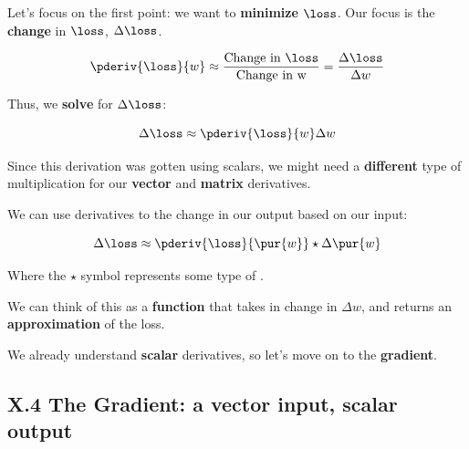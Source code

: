         Let's focus on the first point: we want to \textbf{minimize} $\loss$. Our focus is the \textbf{change} in $\loss$, $\Delta \loss$.
        
        \begin{equation}
            \pderiv{\loss}{w} 
            \approx 
            \frac{\text{Change in }\loss }{ \text{Change in w} }
            =
            \frac{\Delta \loss}{ \Delta w}
        \end{equation}
        
        Thus, we \textbf{solve} for $\Delta \loss$:
        
        \begin{equation}
            \Delta \loss
            \approx
            \pderiv{\loss}{w} 
            \Delta w
        \end{equation}
        
        Since this derivation was gotten using scalars, we might need a \textbf{different} type of multiplication for our \textbf{vector} and \textbf{matrix} derivatives.\\
        
        \begin{concept}
            We can use derivatives to  the change in our output based on our input:
            
            \begin{equation*}
                \Delta \loss
                \approx
                \pderiv{\loss}{\pur{w}} 
                \star
                \Delta \pur{w}
            \end{equation*}
            
            Where the $\star$ symbol represents some type of .
            
        \end{concept}
        
        We can think of this as a \textbf{function} that takes in change in $\Delta w$, and returns an \textbf{approximation} of the loss.
        
        We already understand \textbf{scalar} derivatives, so let's move on to the \textbf{gradient}.
        
    \secdiv
    
    \subsection*{X.4 \quad The Gradient: a vector input, scalar output}
    
